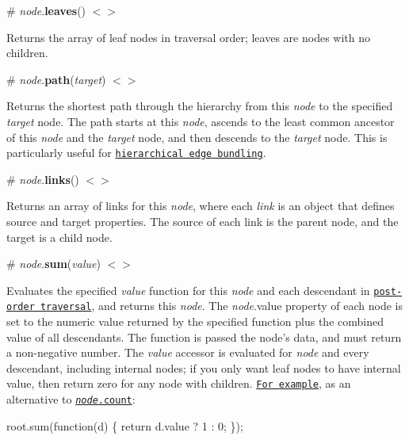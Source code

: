 \label{_node_leaves}%
\# {\itshape node}.{\bfseries leaves}() \href{https://github.com/d3/d3-hierarchy/blob/master/src/hierarchy/leaves.js}{\tt $<$$>$}

Returns the array of leaf nodes in traversal order; leaves are nodes with no children.

\label{_node_path}%
\# {\itshape node}.{\bfseries path}({\itshape target}) \href{https://github.com/d3/d3-hierarchy/blob/master/src/hierarchy/path.js}{\tt $<$$>$}

Returns the shortest path through the hierarchy from this {\itshape node} to the specified {\itshape target} node. The path starts at this {\itshape node}, ascends to the least common ancestor of this {\itshape node} and the {\itshape target} node, and then descends to the {\itshape target} node. This is particularly useful for \href{https://bl.ocks.org/mbostock/7607999}{\tt hierarchical edge bundling}.

\label{_node_links}%
\# {\itshape node}.{\bfseries links}() \href{https://github.com/d3/d3-hierarchy/blob/master/src/hierarchy/links.js}{\tt $<$$>$}

Returns an array of links for this {\itshape node}, where each {\itshape link} is an object that defines source and target properties. The source of each link is the parent node, and the target is a child node.

\label{_node_sum}%
\# {\itshape node}.{\bfseries sum}({\itshape value}) \href{https://github.com/d3/d3-hierarchy/blob/master/src/hierarchy/sum.js}{\tt $<$$>$}

Evaluates the specified {\itshape value} function for this {\itshape node} and each descendant in \href{#node_eachAfter}{\tt post-\/order traversal}, and returns this {\itshape node}. The {\itshape node}.value property of each node is set to the numeric value returned by the specified function plus the combined value of all descendants. The function is passed the node’s data, and must return a non-\/negative number. The {\itshape value} accessor is evaluated for {\itshape node} and every descendant, including internal nodes; if you only want leaf nodes to have internal value, then return zero for any node with children. \href{http://bl.ocks.org/mbostock/b4c0f143db88a9eb01a315a1063c1d77}{\tt For example}, as an alternative to \href{#node_count}{\tt {\itshape node}.count}\+:


\begin{DoxyCode}
root.sum(function(d) \{ return d.value ? 1 : 0; \});
\end{DoxyCode}


